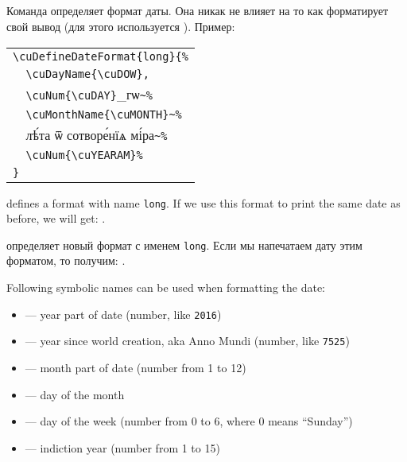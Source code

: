 \begin{RU}
\subsection{}
Команда определяет формат даты. Она никак не влияет на то как  форматирует свой вывод (для этого используется ).
Пример:
\end{RU}

\begin{center}
\begin{churchslavonic}
\begin{tabular}{l}
\verb+\cuDefineDateFormat{long}{%+\\
\verb+  \cuDayName{\cuDOW},+\\
\verb+  \cuNum{\cuDAY}+_гѡ\verb+~%+\\
\verb+  \cuMonthName{\cuMONTH}~%+\\
\verb+  +лѣ́та ѿ сотворе́нїѧ мі́ра\verb+~%+\\
\verb+  \cuNum{\cuYEARAM}%+\\
\verb+}+\\
\end{tabular}
\end{churchslavonic}
\end{center}
%
\begin{EN}
defines a format with name \texttt{long}. If we use this format to print the same date as before, we will get:
.
\end{EN}
%
\begin{RU}
определяет новый формат с именем \texttt{long}. Если мы напечатаем дату этим форматом, то получим:
.
\end{RU}

\begin{EN}
Following symbolic names can be used when formatting the date:
\begin{itemize}
\item {} --- year part of date (number, like \texttt{2016})
\item {}\footnotemark[1] --- year since world creation, aka Anno Mundi (number, like \texttt{7525})
\item {} --- month part of date (number from 1 to 12)
\item {} --- day of the month
\item {}\footnotemark[1] --- day of the week (number from 0 to 6, where 0 means ``Sunday'')
\item {} --- indiction year (number from 1 to 15)
\end{itemize}
\end{EN}

